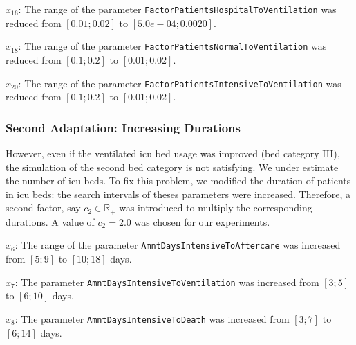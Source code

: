 \documentclass[conference]{IEEEtran}
\begin{document}
\begin{compactitem} 
\item[$x_{16}$:] The range of the parameter \texttt{Factor\-Patients\-Hospital\-To\-Ventilation}  was reduced from $[0.01; 0.02]$ to $[5.0e-04; 0.0020]$. 
\item[$x_{18}$:] The range of the parameter \texttt{Factor\-Patients\-Normal\-To\-Ventilation} was reduced from $[0.1; 0.2]$ to $[0.01; 0.02]$. 
\item[$x_{20}$:] The range of the parameter \texttt{Factor\-Patients\-Intensive\-To\-Ventilation} was reduced from $[0.1; 0.2]$ to $[0.01; 0.02]$. 
\end{compactitem}


\subsubsection{Second Adaptation: Increasing Durations}

However, even if the ventilated icu bed usage was improved (bed category III), the simulation of the second bed category is not satisfying. We under estimate the number of icu beds.
To fix this problem, we modified the duration of patients in icu beds: the search intervals of theses parameters were increased. Therefore, a second factor, say $c_2 \in \mathbb{R}_+$ was introduced to multiply the corresponding durations. A value of $c_2 = 2.0$ was chosen for our experiments.



\begin{compactitem} 
\item[$x_{6}$:] The range of the parameter \texttt{AmntDays\-Intensive\-To\-Aftercare} was increased from $[5;9]$ to $[10;18]$ days.
\item[$x_{7}$:] The parameter \texttt{AmntDays\-Intensive\-To\-Ventilation} was increased from $[3;5]$ to $[6;10]$ days.
\item[$x_{8}$:] The parameter \texttt{AmntDays\-Intensive\-To\-Death} was increased from $[3;7]$ to $[6;14]$ days.
\end{compactitem}
\end{document}
